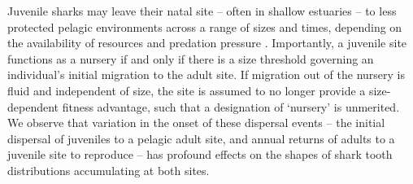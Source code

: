 \documentclass[]{rsos}%
\begin{document}
Juvenile sharks may leave their natal site -- often in shallow estuaries \cite{Kneebone2012, heupel2007shark} -- to less protected pelagic environments across a range of sizes and times, depending on the availability of resources and predation pressure \cite{heupel2014sizing}.
Importantly, a juvenile site functions as a nursery if and only if there is a size threshold governing an individual's initial migration to the adult site. 
If migration out of the nursery is fluid and independent of size, the site is assumed to no longer provide a size-dependent fitness advantage, such that a designation of `nursery' is unmerited.
We observe that variation in the onset of these dispersal events -- the initial dispersal of juveniles to a pelagic adult site, and annual returns of adults to a juvenile site to reproduce -- has profound effects on the shapes of shark tooth distributions accumulating at both sites.
\end{document}
